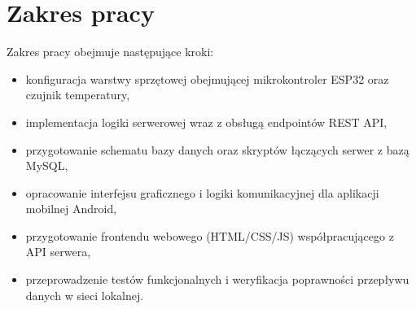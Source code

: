 \section{Zakres pracy}
Zakres pracy obejmuje następujące kroki:
\begin{itemize}
    \item konfiguracja warstwy sprzętowej obejmującej mikrokontroler ESP32 oraz czujnik temperatury,
    \item implementacja logiki serwerowej wraz z obsługą endpointów REST API,
    \item przygotowanie schematu bazy danych oraz skryptów łączących serwer z bazą MySQL,
    \item opracowanie interfejsu graficznego i logiki komunikacyjnej dla aplikacji mobilnej Android,
    \item przygotowanie frontendu webowego (HTML/CSS/JS) współpracującego z API serwera,
    \item przeprowadzenie testów funkcjonalnych i weryfikacja poprawności przepływu danych w sieci lokalnej.
\end{itemize}
